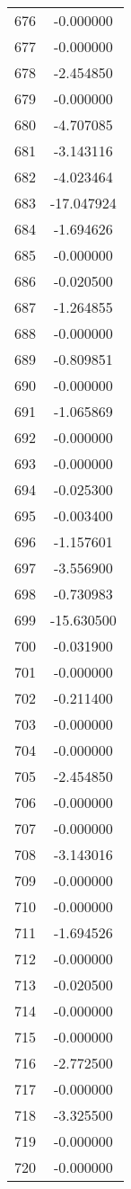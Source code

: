 \documentclass[12pt]{article}
\begin{document}
\begin{longtable}{@{}cc@{}}
676 & -0.000000 \\
677 & -0.000000 \\
678 & -2.454850 \\
679 & -0.000000 \\
680 & -4.707085 \\
681 & -3.143116 \\
682 & -4.023464 \\
683 & -17.047924 \\
684 & -1.694626 \\
685 & -0.000000 \\
686 & -0.020500 \\
687 & -1.264855 \\
688 & -0.000000 \\
689 & -0.809851 \\
690 & -0.000000 \\
691 & -1.065869 \\
692 & -0.000000 \\
693 & -0.000000 \\
694 & -0.025300 \\
695 & -0.003400 \\
696 & -1.157601 \\
697 & -3.556900 \\
698 & -0.730983 \\
699 & -15.630500 \\
700 & -0.031900 \\
701 & -0.000000 \\
702 & -0.211400 \\
703 & -0.000000 \\
704 & -0.000000 \\
705 & -2.454850 \\
706 & -0.000000 \\
707 & -0.000000 \\
708 & -3.143016 \\
709 & -0.000000 \\
710 & -0.000000 \\
711 & -1.694526 \\
712 & -0.000000 \\
713 & -0.020500 \\
714 & -0.000000 \\
715 & -0.000000 \\
716 & -2.772500 \\
717 & -0.000000 \\
718 & -3.325500 \\
719 & -0.000000 \\
720 & -0.000000 \\

\end{longtable}
\end{document}
